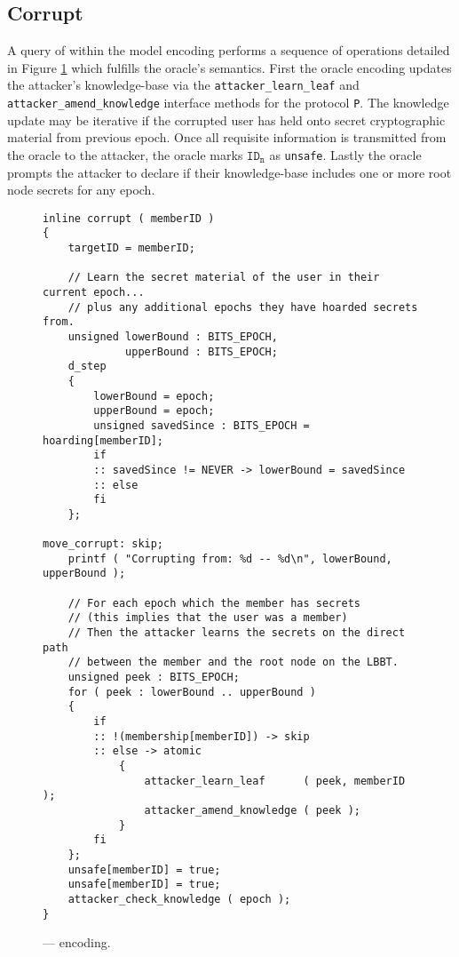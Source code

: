 \hypertarget{sec:corrupt}{%
\subsection{Corrupt}\label{sec:corrupt}}

A query of  within the  model encoding performs a sequence of operations detailed in Figure \ref{fig:Oracle-Corrupt} which fulfills the oracle's semantics.
First the oracle encoding updates the attacker's knowledge-base via the \texttt{attacker\_learn\_leaf} and \texttt{attacker\_amend\_knowledge} interface methods for the protocol \texttt{P}.
The knowledge update may be iterative if the corrupted user has held onto secret cryptographic material from previous epoch.
Once all requisite information is transmitted from the oracle to the attacker, the oracle marks \(\mathtt{ID_n}\) as \texttt{unsafe}.
Lastly the oracle prompts the attacker to declare if their knowledge-base includes one or more  root node secrets for any epoch.

\begin{figure}[h!]
  \centering
  \caption{\label{fig:Oracle-Corrupt}\CGKAmod{}{}{} ---  encoding.}
\begin{verbatim}
inline corrupt ( memberID )
{
    targetID = memberID;

    // Learn the secret material of the user in their current epoch...
    // plus any additional epochs they have hoarded secrets from.
    unsigned lowerBound : BITS_EPOCH,
             upperBound : BITS_EPOCH;
    d_step
    {
        lowerBound = epoch;
        upperBound = epoch;
        unsigned savedSince : BITS_EPOCH = hoarding[memberID];
        if
        :: savedSince != NEVER -> lowerBound = savedSince
        :: else
        fi
    };

move_corrupt: skip;
    printf ( "Corrupting from: %d -- %d\n", lowerBound, upperBound );

    // For each epoch which the member has secrets
    // (this implies that the user was a member)
    // Then the attacker learns the secrets on the direct path
    // between the member and the root node on the LBBT.
    unsigned peek : BITS_EPOCH;
    for ( peek : lowerBound .. upperBound )
    {
        if
        :: !(membership[memberID]) -> skip
        :: else -> atomic
            {
                attacker_learn_leaf      ( peek, memberID );
                attacker_amend_knowledge ( peek );
            }
        fi
    };
    unsafe[memberID] = true;
    unsafe[memberID] = true;
    attacker_check_knowledge ( epoch );
}
\end{verbatim}
\end{figure}

